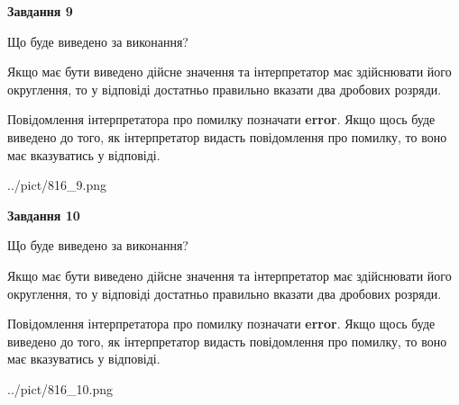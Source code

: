 \documentclass[12pt, ukrainian]{article}
\begin{document}
{\begin {Large}
{\begin {center}\textbf{Завдання 9}\end {center}}\par
Що буде виведено за виконання? \par

Якщо має бути виведено дійсне значення та інтерпретатор має здійснювати його округлення, 
то у відповіді достатньо правильно вказати два дробових розряди.

Повідомлення інтерпретатора про помилку позначати \textbf{error}.
Якщо щось буде виведено до того, як інтерпретатор видасть повідомлення про помилку, 
то воно має вказуватись у відповіді. \par

\begin{center}
	{../pict/816_9.png}
\end{center}
\newpage

{\begin {center}\textbf{Завдання 10}\end {center}}\par
Що буде виведено за виконання? \par

Якщо має бути виведено дійсне значення та інтерпретатор має здійснювати його округлення, 
то у відповіді достатньо правильно вказати два дробових розряди.

Повідомлення інтерпретатора про помилку позначати \textbf{error}.
Якщо щось буде виведено до того, як інтерпретатор видасть повідомлення про помилку, 
то воно має вказуватись у відповіді. \par

\begin{center}
	{../pict/816_10.png}
\end{center}
\newpage

\end {Large}}
\end{document}
